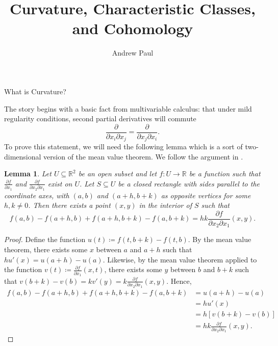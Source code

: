 \documentclass{article}
\title{\vspace{-1in}Curvature, Characteristic Classes, and Cohomology}
\author{Andrew Paul}
\date{}
\numberwithin{equation}{subsection}
\newtheorem{lemma}{Lemma}[subsection]
\theoremstyle{definition}
\begin{document}
\maketitle

\begin{section}{What is Curvature?}

The story begins with a basic fact from multivariable calculus: that under mild regularity conditions, second partial derivatives will commute
\begin{equation}
\frac{\partial}{\partial x_i\partial x_j}=\frac{\partial}{\partial x_j\partial x_i}.
\end{equation}
To prove this statement, we will need the following lemma which is a sort of two-dimensional version of the mean value theorem. We follow the argument in \cite{Rudin}.

\begin{lemma}
\label{MVT}
Let $U\subseteq\mathbb{R}^2$ be an open subset and let $f\colon U\to\mathbb{R}$ be a function such that $\frac{\partial f}{\partial x_1}$ and $\frac{\partial f}{\partial x_2\partial x_1}$ exist on $U$. Let $S\subseteq U$ be a closed rectangle with sides parallel to the coordinate axes, with $(a,b)$ and $(a+h,b+k)$ as opposite vertices for some $h,k\neq0$. Then there exists a point $(x,y)$ in the interior of $S$ such that
\begin{equation}
f(a,b)-f(a+h,b)+f(a+h,b+k)-f(a,b+k)=hk\frac{\partial f}{\partial x_2\partial x_1}(x,y).
\end{equation}
\end{lemma}

\begin{proof}
Define the function $u(t)\coloneqq f(t,b+k)-f(t,b)$. By the mean value theorem, there exists some $x$ between $a$ and $a+h$ such that $hu'(x)=u(a+h)-u(a)$. Likewise, by the mean value theorem applied to the function $v(t)\coloneqq\frac{\partial f}{\partial x_1}(x,t)$, there exists some $y$ between $b$ and $b+k$ such that $v(b+k)-v(b)=kv'(y)=k\frac{\partial f}{\partial x_2\partial x_1}(x,y)$. Hence,
\begin{equation}
\begin{split}
f(a,b)-f(a+h,b)+f(a+h,b+k)-f(a,b+k)&=u(a+h)-u(a)\\
&=hu'(x)\\
&=h[v(b+k)-v(b)]\\
&=hk\frac{\partial f}{\partial x_2\partial x_1}(x,y).
\end{split}
\end{equation}
\end{proof}


\end{section}
\end{document}
